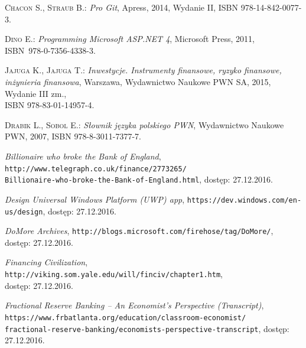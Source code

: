 \documentclass[a4paper,twoside,titlepage,openright]{book}
\begin{document}
 
 
 
\clearpage{\pagestyle{empty}\cleardoublepage}
\listoffigures





\clearpage{\pagestyle{empty}\cleardoublepage}
\begin{thebibliography}{99}

 \textsc{Chacon S., Straub B.:}
\textit{Pro Git}, Apress, 2014, Wydanie II, ISBN 978-14-842-0077-3.

 \textsc{Dino E.:}
\textit{Programming Microsoft ASP.NET 4}, Microsoft Press, 2011, \\ISBN~978-0-7356-4338-3.

 \textsc{Jajuga K., Jajuga T.:}
\textit{Inwestycje. Instrumenty finansowe, ryzyko finansowe, inżynieria finansowa}, Warszawa, Wydawnictwo Naukowe PWN SA, 2015, Wydanie III zm., \\ISBN 978-83-01-14957-4.

 \textsc{Drabik L., Sobol	E.:}
\textit{Słownik języka polskiego PWN}, Wydawnictwo Naukowe PWN, 2007, ISBN 978-8-3011-7377-7.

 \textit{Billionaire who broke the Bank of England}, 
\texttt{http://www.telegraph.co.uk/finance/2773265/\\Billionaire-who-broke-the-Bank-of-England.html}, dostęp: 27.12.2016.

 \textit{Design Universal Windows Platform (UWP) app}, 
\texttt{https://dev.windows.com/en-us/design}, dostęp: 27.12.2016.

 \textit{DoMore Archives}, 
\texttt{http://blogs.microsoft.com/firehose/tag/DoMore/}, \\dostęp: 27.12.2016.

 \textit{Financing Civilization}, 
\texttt{http://viking.som.yale.edu/will/finciv/chapter1.htm}, \\dostęp: 27.12.2016.

 \textit{Fractional Reserve Banking -- An Economist's Perspective (Transcript)}, \\
\texttt{https://www.frbatlanta.org/education/classroom-economist/\\fractional-reserve-banking/economists-perspective-transcript}, dostęp: 27.12.2016.


\end{thebibliography}
\end{document}
